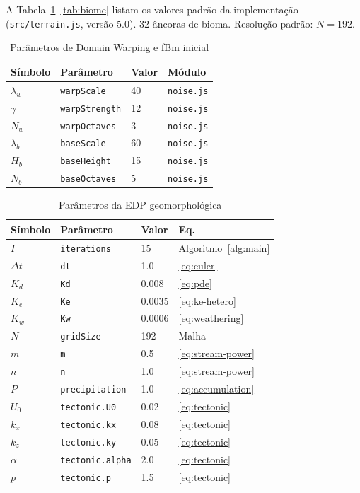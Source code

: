 \documentclass[11pt,a4paper]{article}
\begin{document}
A Tabela~\ref{tab:noise}--\ref{tab:biome} listam os valores padrão da implementação
(\texttt{src/terrain.js}, versão 5.0). $32$ âncoras de bioma. Resolução padrão: $N = 192$.

\begin{table}[H]
\centering
\caption{Parâmetros de Domain Warping e fBm inicial}
\label{tab:noise}
\begin{tabular}{@{}llll@{}}
\toprule
\textbf{Símbolo} & \textbf{Parâmetro} & \textbf{Valor} & \textbf{Módulo} \\
\midrule
$\lambda_w$  & \texttt{warpScale}     & 40   & \texttt{noise.js} \\
$\gamma$     & \texttt{warpStrength}  & 12   & \texttt{noise.js} \\
$N_w$        & \texttt{warpOctaves}   & 3    & \texttt{noise.js} \\
$\lambda_b$  & \texttt{baseScale}     & 60   & \texttt{noise.js} \\
$H_b$        & \texttt{baseHeight}    & 15   & \texttt{noise.js} \\
$N_b$        & \texttt{baseOctaves}   & 5    & \texttt{noise.js} \\
\bottomrule
\end{tabular}
\end{table}

\begin{table}[H]
\centering
\caption{Parâmetros da EDP geomorphológica}
\label{tab:geomorph}
\begin{tabular}{@{}llll@{}}
\toprule
\textbf{Símbolo} & \textbf{Parâmetro} & \textbf{Valor} & \textbf{Eq.} \\
\midrule
$I$     & \texttt{iterations}   & 15    & Algoritmo~\ref{alg:main} \\
$\Delta t$ & \texttt{dt}        & 1.0   & \eqref{eq:euler} \\
$K_d$   & \texttt{Kd}           & 0.008 & \eqref{eq:pde} \\
$K_e$   & \texttt{Ke}           & 0.0035 & \eqref{eq:ke-hetero} \\
$K_w$   & \texttt{Kw}           & 0.0006 & \eqref{eq:weathering} \\
$N$     & \texttt{gridSize}     & 192   & Malha \\
$m$     & \texttt{m}            & 0.5   & \eqref{eq:stream-power} \\
$n$     & \texttt{n}            & 1.0   & \eqref{eq:stream-power} \\
$P$     & \texttt{precipitation}& 1.0   & \eqref{eq:accumulation} \\
$U_0$   & \texttt{tectonic.U0}  & 0.02  & \eqref{eq:tectonic} \\
$k_x$   & \texttt{tectonic.kx}  & 0.08  & \eqref{eq:tectonic} \\
$k_z$   & \texttt{tectonic.ky}  & 0.05  & \eqref{eq:tectonic} \\
$\alpha$& \texttt{tectonic.alpha}& 2.0  & \eqref{eq:tectonic} \\
$p$     & \texttt{tectonic.p}   & 1.5   & \eqref{eq:tectonic} \\
\bottomrule
\end{tabular}
\end{table}
\end{document}
